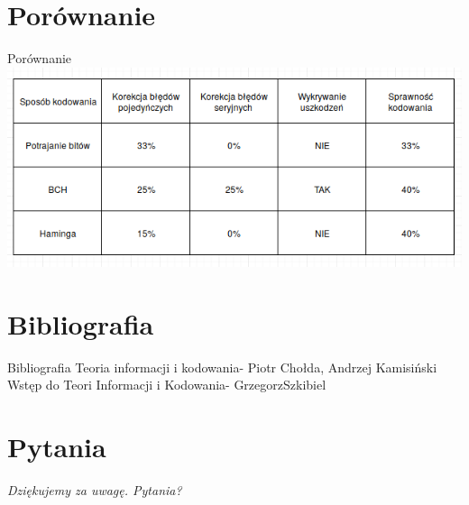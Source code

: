 \documentclass[12pt]{beamer}
\begin{document}
\section{Porównanie}
\begin{frame}{Porównanie}
\centering
\includegraphics[scale= 0.5]{image_source/porownanie.png}
		
\end{frame}

\section{Bibliografia}
\begin{frame}{Bibliografia}
	Teoria informacji i kodowania- Piotr Chołda, Andrzej Kamisiński
	Wstęp do Teori Informacji i Kodowania- GrzegorzSzkibiel
\end{frame}

\section*{Pytania}
\begin{frame}
	\centering \Large\emph{Dziękujemy za uwagę. Pytania?}
\end{frame}
\end{document}
